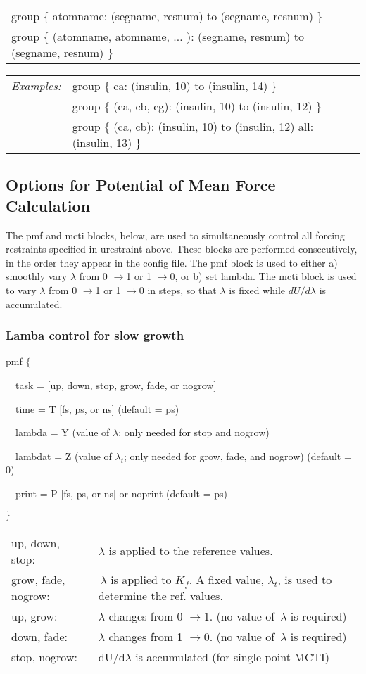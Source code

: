 \begin{tabular}{l}
group $\{$ atomname: (segname, resnum) to (segname, resnum) $\}$ \\ 
group $\{$ (atomname, atomname, $\ldots $ ): (segname, resnum) to (segname,
resnum) $\}$%
\end{tabular}

\begin{tabular}{ll}
{\em Examples:} & group $\{$ ca: (insulin, 10) to (insulin, 14) $\}$ \\ 
& group $\{$ (ca, cb, cg): (insulin, 10) to (insulin, 12) $\}$ \\ 
& group $\{$ (ca, cb): (insulin, 10) to (insulin, 12) all: (insulin, 13) $\}$
\pagebreak 
\end{tabular}
\pagebreak 

\subsection{Options for Potential of Mean Force Calculation}

The pmf and mcti blocks, below, are used to simultaneously control all
forcing restraints specified in urestraint above. These blocks are performed
consecutively, in the order they appear in the config file. The pmf block is
used to either a) smoothly vary $\lambda $ from 0 $\rightarrow $1 or 1 $%
\rightarrow $0, or b) set lambda. The mcti block is used to vary $\lambda $
from 0 $\rightarrow $1 or 1 $\rightarrow $0 in steps, so that $\lambda $ is
fixed while $dU/d\lambda $ is accumulated.\medskip

\subsubsection{Lamba control for slow growth}

pmf $\{$

~~task = [up, down, stop, grow, fade, or nogrow]

~~time = T [fs, ps, or ns] (default = ps)

~~lambda = Y (value of $\lambda $; only needed for stop and nogrow)

~~lambdat = Z (value of $\lambda _{t}$; only needed for grow, fade, and
nogrow) (default = 0)

~~print = P [fs, ps, or ns] or noprint (default = ps)

$\}\medskip $

\begin{tabular}{ll}
up, down, stop: & $\lambda $ is applied to the reference values. \\ 
grow, fade, nogrow: & $\,\lambda $ is applied to $K_{f}$. A fixed value, $%
\lambda _{t}$, is used to determine the ref. values. \\ 
up, grow: & $\lambda $ changes from 0 $\rightarrow $1. (no value of $
\,\lambda $ is required) \\ 
down, fade: & $\lambda $ changes from 1 $\rightarrow $0. (no value of $%
\,\lambda $ is required) \\ 
stop, nogrow: & dU/d$\lambda $ is accumulated (for single point
MCTI)\medskip \smallskip
\end{tabular}
\bigskip

